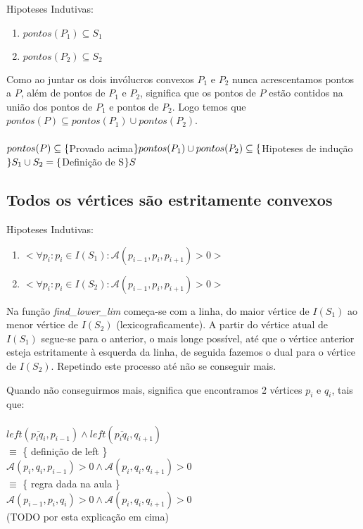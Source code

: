\documentclass[11pt]{article}
\begin{document}
Hipoteses Indutivas:
\begin{enumerate}
    \item $pontos(P_1) \subseteq S_1$
    \item $pontos(P_2) \subseteq S_2$
\end{enumerate}
Como ao juntar os dois invólucros convexos $P_1$ e $P_2$
nunca acrescentamos pontos a $P$, além de pontos de $P_1$ e $P_2$, 
significa que os pontos de $P$ estão contidos na 
união dos pontos de $P_1$ e pontos de $P_2$.
Logo temos que $pontos(P) \subseteq pontos(P_1) \cup pontos(P_2)$.\\ \\
$pontos(P) \\
\subseteq \{$Provado acima$\}\\
pontos(P_1) \cup pontos(P_2) \\
\subseteq \{$Hipoteses de indução$\} \\
S_1 \cup S_2 \\
= \{$Definição de S$\}\\
S$


\subsection{Todos os vértices são estritamente convexos}

Hipoteses Indutivas:
\begin{enumerate}
    \item $< \forall p_i : p_i \in I(S_1) : \mathcal{A}(p_{i-1}, p_i, p_{i+1}) > 0 >$
    \item $< \forall p_i : p_i \in I(S_2) : \mathcal{A}(p_{i-1}, p_i, p_{i+1}) > 0 >$
\end{enumerate}

Na função \textit{find\_lower\_lim} começa-se com a linha,
do maior vértice de $I(S_1)$ ao menor vértice de $I(S_2)$ (lexicograficamente).
A partir do vértice atual de $I(S_1)$ segue-se para o anterior, o mais 
longe possível, até que o vértice anterior esteja estritamente à
esquerda da linha, de seguida fazemos o dual para o vértice de $I(S_2)$.
Repetindo este processo até não se conseguir mais.
\par

Quando não conseguirmos mais, significa que encontramos 2 vértices 
$p_i$ e $q_i$, tais que:\\
\\
$left(\overline{p_i q_i}, p_{i-1}) \wedge left(\overline{p_i q_i}, q_{i+1})$\\
$\equiv$ \{ definição de left \}\\
$\mathcal{A}(p_i, q_i, p_{i-1}) > 0 \wedge \mathcal{A}(p_i, q_i, q_{i+1}) > 0$\\
$\equiv$ \{ regra dada na aula \}\\
$\mathcal{A}(p_{i-1}, p_i, q_i) > 0 \wedge \mathcal{A}(p_i, q_i, q_{i+1}) > 0$\\
(TODO por esta explicação em cima)\\
\end{document}
